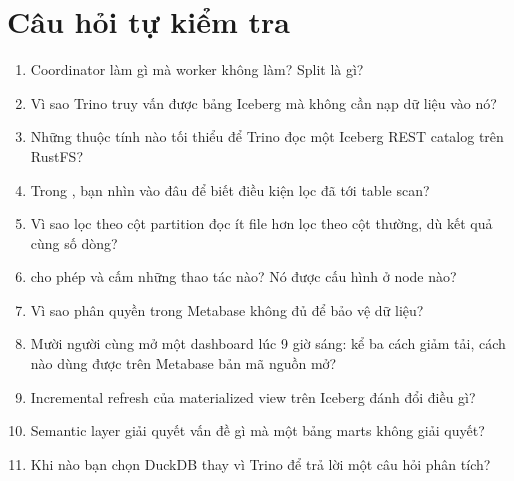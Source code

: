 \section{Câu hỏi tự kiểm tra}
\begin{enumerate}
  \item Coordinator làm gì mà worker không làm? Split là gì?
  \item Vì sao Trino truy vấn được bảng Iceberg mà không cần nạp dữ liệu vào nó?
  \item Những thuộc tính nào tối thiểu để Trino đọc một Iceberg REST catalog trên RustFS?
  \item Trong , bạn nhìn vào đâu để biết điều kiện lọc đã tới table scan?
  \item Vì sao lọc theo cột partition đọc ít file hơn lọc theo cột thường, dù kết quả cùng số dòng?
  \item {} cho phép và cấm những thao tác nào? Nó được cấu hình ở node nào?
  \item Vì sao phân quyền trong Metabase không đủ để bảo vệ dữ liệu?
  \item Mười người cùng mở một dashboard lúc 9 giờ sáng: kể ba cách giảm tải, cách nào dùng được trên Metabase bản mã nguồn mở?
  \item Incremental refresh của materialized view trên Iceberg đánh đổi điều gì?
  \item Semantic layer giải quyết vấn đề gì mà một bảng marts không giải quyết?
  \item Khi nào bạn chọn DuckDB thay vì Trino để trả lời một câu hỏi phân tích?
\end{enumerate}

